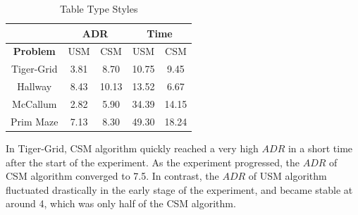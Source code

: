 \documentclass[conference]{IEEEtran}
\begin{document}
	\begin{table}[htbp]
		\caption{Table Type Styles}
		\begin{center}
			\begin{tabular}{|c|c|c|c|c|}
				\hline
				&\multicolumn{2}{|c|}{\textbf{ADR}} &\multicolumn{2}{|c|}{\textbf{Time}} \\
				\hline
				\textbf{Problem}      & USM         & CSM               &USM           & CSM      \\
				\hline
				Tiger-Grid    & 3.81        & 8.70              & 10.75        & 9.45     \\ 
				Hallway       & 8.43        & 10.13             & 13.52        & 6.67     \\ 
				McCallum      & 2.82        & 5.90              & 34.39        & 14.15    \\ 
				Prim Maze     & 7.13        & 8.30              & 49.30        & 18.24    \\ 
				\hline
			\end{tabular}
			
			\label{tab1}
		\end{center}
	\end{table}
	
	
	
	In Tiger-Grid, CSM algorithm quickly reached a very high $ADR$ in a short
	time after the start of the experiment. As the experiment progressed, the $ADR$ of
	CSM algorithm converged to 7.5. In contrast, the $ADR$ of USM algorithm fluctuated
	drastically in the early stage of the experiment, and became stable at around 4, which
	was only half of the CSM algorithm.
	
\end{document}
